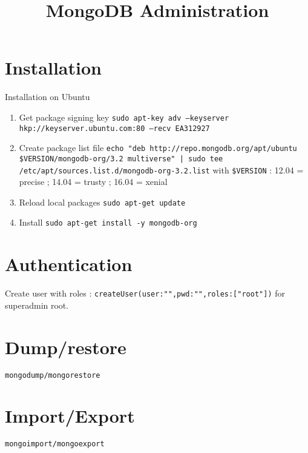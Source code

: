 


\title{MongoDB Administration\bigskip
}
\author{}
\date{}


\maketitle

\justify



\section*{Installation}

Installation on Ubuntu

\begin{enumerate}
\item Get package signing key
\texttt{sudo apt-key adv --keyserver hkp://keyserver.ubuntu.com:80 --recv EA312927}
\item Create package list file
\texttt{echo "deb http://repo.mongodb.org/apt/ubuntu {\$}VERSION/mongodb-org/3.2 multiverse" | sudo tee /etc/apt/sources.list.d/mongodb-org-3.2.list} with \texttt{{\$}VERSION} : 12.04 = precise ; 14.04 = trusty ; 16.04 = xenial
\item Reload local packages \texttt{sudo apt-get update}
\item Install \texttt{sudo apt-get install -y mongodb-org}
\end{enumerate}


\section*{Authentication}

Create user with roles : \texttt{createUser({user:"",pwd:"",roles:["root"]})} for superadmin root.


\section*{Dump/restore}

\texttt{mongodump/mongorestore}


\section*{Import/Export}

\texttt{mongoimport/mongoexport}





















